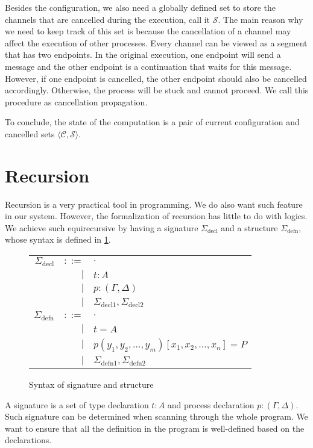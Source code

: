 \documentclass[12pt, openany]{memoir}
\newcommand*{\config}[0]{\mathcal{C}}
\newcommand*{\cancelSet}[0]{\mathcal{S}}
\begin{document}
Besides the configuration, we also need a globally defined set to store the channels that are cancelled during the execution, call it $\cancelSet$.
The main reason why we need to keep track of this set is because the cancellation of a channel may affect the execution of other processes.
Every channel can be viewed as a segment that has two endpoints. In the original execution, one endpoint will send a message and the other endpoint is a continuation that waits for this message.
However, if one endpoint is cancelled, the other endpoint should also be cancelled accordingly. 
Otherwise, the process will be stuck and cannot proceed. We call this procedure as cancellation propagation.

To conclude, the state of the computation is a pair of current configuration and cancelled sets $\langle \config, \cancelSet \rangle$.
\section{Recursion}
Recursion is a very practical tool in programming. We do also want such feature in our system.
However, the formalization of recursion has little to do with logics. We achieve such equirecursive by having a signature $\Sigma_{\text{decl}}$ and a structure $\Sigma_{\text{defn}}$,
whose syntax is defined in \cref{fig:syntaxsig}.
\begin{figure}[H]
  \centering
  \begin{tabular}{r r l}
    $\Sigma_{\text{decl}}$ & $::=$ & $\cdot$ \\
    & $\mid$ & $t : A$ \\
    & $\mid$ & $p : (\Gamma, \Delta)$ \\
    & $\mid$ & $\Sigma_{\text{decl}1}, \Sigma_{\text{decl}2}$ \\  
    $\Sigma_{\text{defn}}$ & $::=$ & $\cdot$ \\
    & $\mid$ & $t = A$ \\
    & $\mid$ & $p (y_1, y_2, \ldots, y_m)[x_1, x_2, \ldots, x_n]= P$ \\
    & $\mid$ & $\Sigma_{\text{defn}1}, \Sigma_{\text{defn}2}$
    \end{tabular}
  \caption{Syntax of signature and structure}
  \label{fig:syntaxsig}
\end{figure}
A signature is a set of type declaration $t : A$ and process declaration $p : (\Gamma, \Delta)$.
Such signature can be determined when scanning through the whole program.
We want to ensure that all the definition in the program is well-defined based on the declarations.
\end{document}
